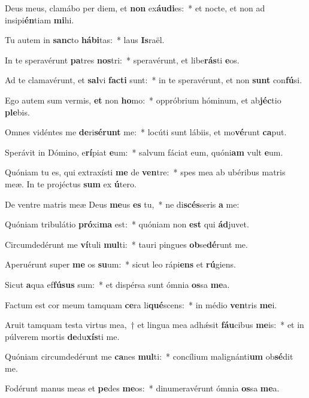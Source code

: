 \item Deus meus, clamábo per diem, et \textbf{non} ex\textbf{áu}\textbf{di}es:~* et nocte, et non ad insipi\textbf{én}tiam \textbf{mi}hi.
\item Tu autem in \textbf{sanc}to \textbf{há}\textbf{bi}tas:~* laus \textbf{Is}raël.
\item In te speravérunt \textbf{pa}tres \textbf{nos}tri:~* speravérunt, et libe\textbf{rás}ti \textbf{e}os.
\item Ad te clamavérunt, et \textbf{sal}vi \textbf{fac}\textbf{ti} sunt:~* in te speravérunt, et non \textbf{sunt} con\textbf{fú}si.
\item Ego autem sum vermis, \textbf{et} non \textbf{ho}mo:~* oppróbrium hóminum, et ab\textbf{jéc}tio \textbf{ple}bis.
\item Omnes vidéntes me \textbf{de}ri\textbf{sé}\textbf{runt} me:~* locúti sunt lábiis, et mo\textbf{vé}runt \textbf{ca}put.
\item Sperávit in Dómino, e\textbf{rí}piat \textbf{e}um:~* salvum fáciat eum, quóni\textbf{am} vult \textbf{e}um.
\item Quóniam tu es, qui extraxísti \textbf{me} de \textbf{ven}tre:~* spes mea ab ubéribus matris meæ. In te projéctus \textbf{sum} ex \textbf{ú}tero.
\item De ventre matris meæ Deus \textbf{me}us \textbf{es} tu,~* ne di\textbf{scés}seris \textbf{a} me:
\item Quóniam tribulátio \textbf{pró}xi\textbf{ma} est:~* quóniam non \textbf{est} qui \textbf{ád}juvet.
\item Circumdedérunt me \textbf{ví}tuli \textbf{mul}ti:~* tauri pingues \textbf{ob}se\textbf{dé}runt me.
\item Aperuérunt super \textbf{me} os \textbf{su}um:~* sicut leo rápi\textbf{ens} et \textbf{rú}giens.
\item Sicut \textbf{a}qua ef\textbf{fú}\textbf{sus} sum:~* et dispérsa sunt ómnia \textbf{os}sa \textbf{me}a.
\item Factum est cor meum tamquam \textbf{ce}ra li\textbf{qué}scens:~* in médio \textbf{ven}tris \textbf{me}i.
\item Aruit tamquam testa virtus mea,~† et lingua mea adhǽsit \textbf{fáu}cibus \textbf{me}is:~* et in púlverem mortis \textbf{de}du\textbf{xís}ti me.
\item Quóniam circumdedérunt me \textbf{ca}nes \textbf{mul}ti:~* concílium malignánti\textbf{um} ob\textbf{sé}dit me.
\item Fodérunt manus meas et \textbf{pe}des \textbf{me}os:~* dinumeravérunt ómnia \textbf{os}sa \textbf{me}a.
